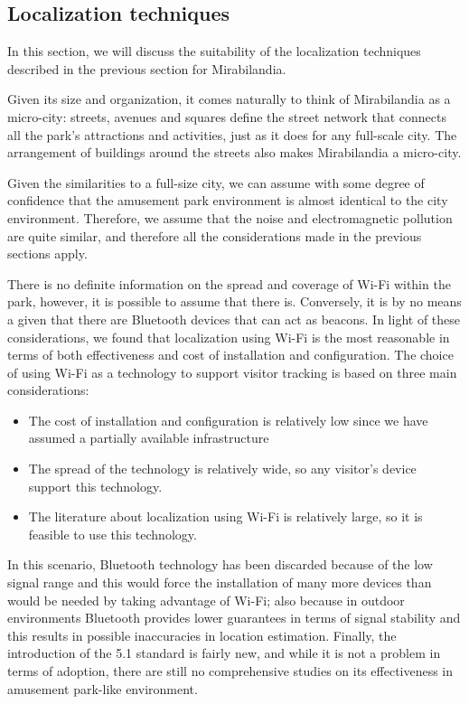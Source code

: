 \subsection{Localization techniques}
In this section, we will discuss the suitability of the localization techniques described in the previous section for Mirabilandia.

Given its size and organization, it comes naturally to think of Mirabilandia as a micro-city: streets, avenues and squares define the street network
that connects all the park's attractions and activities, just as it does for any full-scale city. The arrangement of buildings around the streets
also makes Mirabilandia a micro-city.

Given the similarities to a full-size city, we can assume with some degree of confidence that the amusement park environment is almost identical to
the city environment. Therefore, we assume that the noise and electromagnetic pollution are quite similar, and therefore all the considerations made
in the previous sections apply.

There is no definite information on the spread and coverage of Wi-Fi within the park, however, it is possible to assume that there is. Conversely, it
is by no means a given that there are Bluetooth devices that can act as beacons. In light of these considerations, we found that localization using
Wi-Fi is the most reasonable in terms of both effectiveness and cost of installation and configuration. The choice of using Wi-Fi as a technology to
support visitor tracking is based on three main considerations:

\begin{itemize}
	\item The cost of installation and configuration is relatively low since we have assumed a partially available infrastructure
	\item The spread of the technology is relatively wide, so any visitor's device support this technology.
	\item The literature about localization using Wi-Fi is relatively large, so it is feasible to use this technology.
\end{itemize}

In this scenario, Bluetooth technology has been discarded because of the low signal range and this would force the installation of many more devices
than would be needed by taking advantage of Wi-Fi; also because in outdoor environments Bluetooth provides lower guarantees in terms of signal
stability and this results in possible inaccuracies in location estimation. Finally, the introduction of the 5.1 standard is fairly new, and while it
is not a problem in terms of adoption, there are still no comprehensive studies on its effectiveness in amusement park-like environment.

